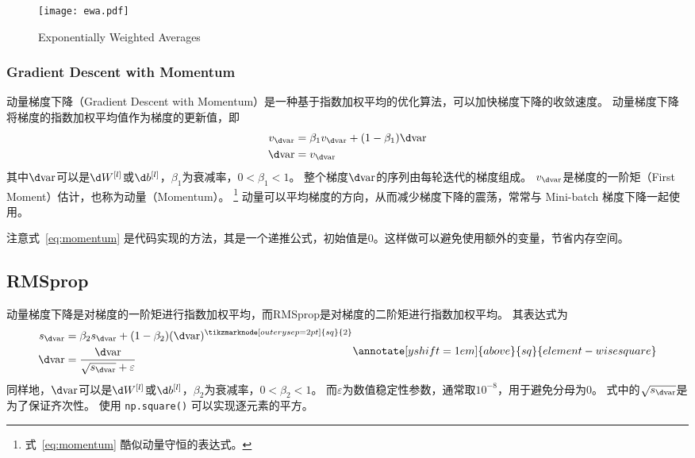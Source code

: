 \begin{figure}[h!bt]
    \centering
    \texttt{[image: ewa.pdf]}
    \caption{Exponentially Weighted Averages}
    \label{fig:ewa}
\end{figure}

\subsubsection{Gradient Descent with Momentum}

动量梯度下降（Gradient Descent with Momentum）是一种基于指数加权平均的优化算法，可以加快梯度下降的收敛速度。
动量梯度下降将梯度的指数加权平均值作为梯度的更新值，即
\begin{equation}
    \begin{aligned}
        v_{\d \mathrm{var}} &= \beta_1 v_{\d \mathrm{var}} + (1 - \beta_1)\d \mathrm{var} \\
        \d \mathrm{var} &= v_{\d \mathrm{var}}
    \end{aligned}
    \label{eq:momentum}
\end{equation}
其中$\d \mathrm{var}$可以是$\d W^{[l]}$或$\d b^{[l]}$，$\beta_1$为衰减率，$0 < \beta_1 < 1$。
整个梯度$\d \mathrm{var}$的序列由每轮迭代的梯度组成。
$v_{\d \mathrm{var}}$是梯度的一阶矩（First Moment）估计，也称为动量（Momentum）。
\footnote{式~\eqref{eq:momentum} 酷似动量守恒的表达式。}
动量可以平均梯度的方向，从而减少梯度下降的震荡，常常与 Mini-batch 梯度下降一起使用。

注意式~\eqref{eq:momentum} 是代码实现的方法，其是一个递推公式，初始值是0。这样做可以避免使用额外的变量，节省内存空间。

\subsection{RMSprop}

动量梯度下降是对梯度的一阶矩进行指数加权平均，而RMSprop是对梯度的二阶矩进行指数加权平均。
其表达式为
\begin{equation}
    \begin{aligned}
        s_{\d \mathrm{var}} &= \beta_2 s_{\d \mathrm{var}} + (1 - \beta_2)(\d \mathrm{var})^{\tikzmarknode[outer ysep=2pt]{sq}{2}} \\
        \d \mathrm{var} &= \frac{\d \mathrm{var}}{\sqrt{s_{\d \mathrm{var}}} + \varepsilon}
    \end{aligned}
    \annotate[yshift=1em]{above}{sq}{element-wise square}
    \label{eq:rmsprop}
\end{equation}
同样地，$\d \mathrm{var}$可以是$\d W^{[l]}$或$\d b^{[l]}$，$\beta_2$为衰减率，$0 < \beta_2 < 1$。
而$\varepsilon$为数值稳定性参数，通常取$10^{-8}$，用于避免分母为0。
式中的$\sqrt{s_{\d \mathrm{var}}}$是为了保证齐次性。
使用 \verb|np.square()| 可以实现逐元素的平方。

